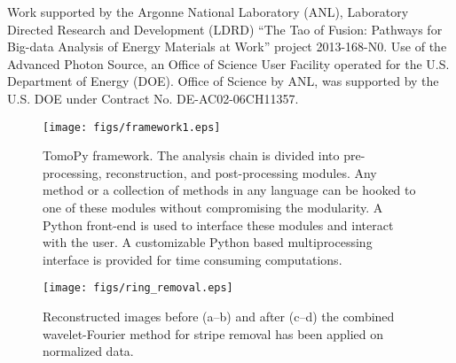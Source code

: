 \documentclass[pdf]{iucr}              %
\begin{document}




Work supported by the Argonne National Laboratory (ANL), Laboratory Directed Research and Development (LDRD) ``The Tao of Fusion: Pathways for Big-data Analysis of Energy Materials at Work'' project 2013-168-N0. Use of the Advanced Photon Source, an Office of Science User Facility operated for the U.S. Department of Energy (DOE). Office of Science by ANL, was supported by the U.S. DOE under Contract No. DE-AC02-06CH11357. 





\begin{figure}
\centering
\texttt{[image: figs/framework1.eps]}
\caption{TomoPy framework. The analysis chain is divided into pre-processing, reconstruction, and post-processing modules. Any method or a collection of methods in any language can be hooked to one of these modules without compromising the modularity. A Python front-end is used to interface these modules and interact with the user. A customizable Python based multiprocessing interface is provided for time consuming computations.}
\label{fig:Framework}
\end{figure}

\begin{figure}
\centering
\texttt{[image: figs/ring\_removal.eps]}
\caption{Reconstructed images before (a--b) and after (c--d) the combined wavelet-Fourier method for stripe removal has been applied on normalized data.}
\label{fig:ProcessRing}
\end{figure}
\end{document}
